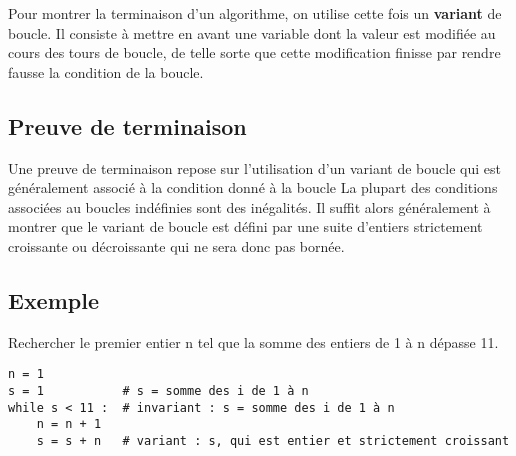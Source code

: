 \begin{defi}
Pour montrer la terminaison d'un algorithme, on utilise cette fois un \textbf{variant} de boucle. 
Il consiste à mettre en avant une variable dont la valeur est modifiée au cours des tours de 
boucle, de telle sorte que cette modification finisse par rendre fausse la condition de la boucle.\\
\end{defi}


\subsection{Preuve de terminaison}


\begin{defi}
Une preuve de terminaison repose sur l'utilisation d'un variant de boucle qui est généralement associé à la condition donné à la boucle  La plupart des conditions associées au boucles indéfinies sont des inégalités. Il suffit alors généralement à montrer que le variant de boucle est défini par une suite d'entiers strictement croissante ou décroissante qui ne sera donc pas bornée.
\end{defi}

\subsection{Exemple}


\begin{exemple}
Rechercher le premier entier n tel que la somme des entiers de 1 à n dépasse 11.

\begin{lstlisting}
n = 1
s = 1           # s = somme des i de 1 à n
while s < 11 :  # invariant : s = somme des i de 1 à n
    n = n + 1
    s = s + n   # variant : s, qui est entier et strictement croissant
\end{lstlisting}
\end{exemple}